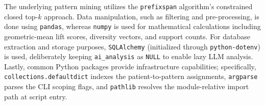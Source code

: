 The underlying pattern mining utilizes the \texttt{prefixspan} algorithm's constrained closed top-\(k\) approach. Data manipulation, such as filtering and pre-processing, is done using \texttt{pandas}, whereas \texttt{numpy} is used for mathematical calculations including geometric-mean lift scores, diversity vectors, and support counts. For database extraction and storage purposes, \texttt{SQLAlchemy} (initialized through \texttt{python-dotenv}) is used, deliberately keeping \texttt{ai\_analysis} as \texttt{NULL} to enable lazy LLM analysis. Lastly, common Python packages provide infrastructure capabilities; specifically, \texttt{collections.defaultdict} indexes the patient-to-pattern assignments, \texttt{argparse} parses the CLI scoping flags, and \texttt{pathlib} resolves the module-relative import path at script entry.